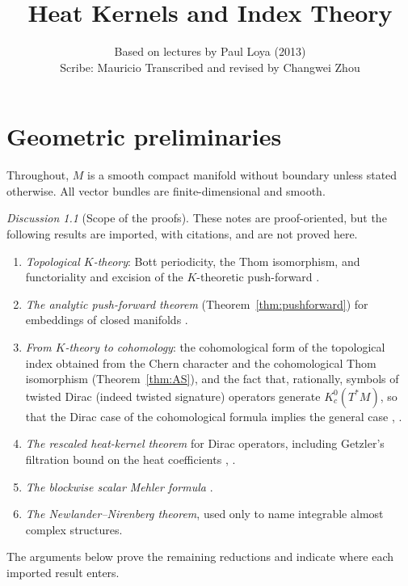 \documentclass[11pt,oneside,reqno]{book}
\title{Heat Kernels and Index Theory}
\author{Based on lectures by Paul Loya (2013)\\[2pt] \small Scribe: Mauricio \quad Transcribed and revised by Changwei Zhou}
\date{}
\theoremstyle{plain}
\theoremstyle{definition}
\theoremstyle{remark}
\newtheorem*{discussion}{Discussion}
\begin{document}
\hypersetup{pageanchor=false}
\maketitle
\clearpage
\hypersetup{pageanchor=true}
\frontmatter
\begingroup
\small
\tableofcontents
\endgroup
\clearpage
\begingroup
\makeatletter
\let\addvspace\@gobble
\makeatother
\listoffigures
\endgroup
\clearpage

\mainmatter

\chapter{Geometric preliminaries}

Throughout, \(M\) is a smooth compact manifold without boundary unless
stated otherwise. All vector bundles are finite-dimensional and smooth.

\begin{discussion}[Scope of the proofs]
These notes are proof-oriented, but the following results are imported,
with citations, and are not proved here.
\begin{enumerate}
\item \emph{Topological \(K\)-theory}: Bott periodicity, the Thom
 isomorphism, and functoriality and excision of the \(K\)-theoretic
 push-forward \cite{ASI,ABS}.
\item \emph{The analytic push-forward theorem}
 (Theorem~\ref{thm:pushforward}) for embeddings of closed manifolds
 \cite{ASI}.
\item \emph{From \(K\)-theory to cohomology}: the cohomological form of the
 topological index obtained from the Chern character and the
 cohomological Thom isomorphism (Theorem~\ref{thm:AS}), and the fact that,
 rationally, symbols of twisted Dirac (indeed twisted signature) operators
 generate \(K_c^0(T^*M)\), so that the Dirac case of the cohomological
 formula implies the general case \cite{ASIII,LM}, \cite[Chapter~4]{BGV}.
\item \emph{The rescaled heat-kernel theorem} for Dirac operators, including
 Getzler's filtration bound on the heat coefficients
 \cite[Chapters~4--5]{BGV}, \cite{Gilkey}.
\item \emph{The blockwise scalar Mehler formula} \cite[Chapter~4]{BGV}.
\item \emph{The Newlander--Nirenberg theorem}, used only to name integrable
 almost complex structures.
\end{enumerate}
The arguments below prove the remaining reductions and indicate where each
imported result enters.
\end{discussion}
\end{document}
